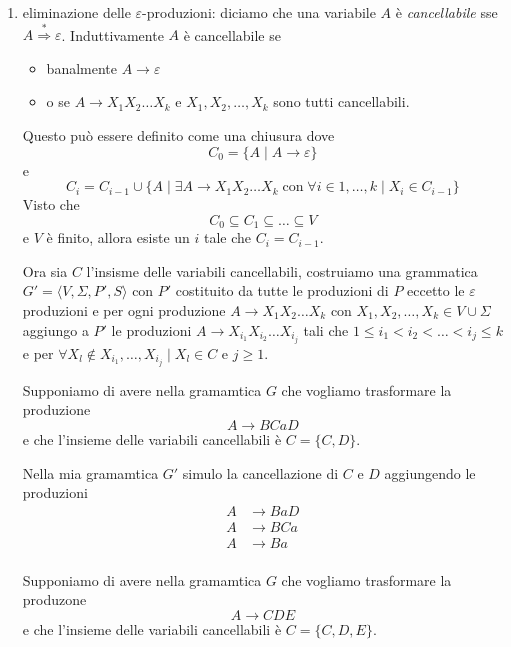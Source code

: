 \documentclass[12pt]{report}
\theoremstyle{definition}
\theoremstyle{regard}
\begin{document}
\begin{enumerate}
	\item eliminazione delle $\varepsilon$-produzioni: diciamo che una variabile $A$ è \textit{cancellabile} sse $A \overset{*}{\Rightarrow} \varepsilon$.
		Induttivamente $A$ è cancellabile se
		\begin{itemize}
			\item banalmente $A \rightarrow \varepsilon$
			\item o se $A \rightarrow X_1 X_2 \dots X_k$ e $X_1, X_2, \dots, X_k$ sono tutti cancellabili.
		\end{itemize}
		Questo può essere definito come una chiusura dove
		$$ C_0 = \{ A \mid A \rightarrow \varepsilon \} $$
		e 
		$$ C_i = C_{i - 1} \cup \{ A \mid \exists A \rightarrow X_1 X_2 \dots X_k \; \text{con} \; \forall i \in 1, \dots, k \mid X_i \in C_{i - 1} \} $$
		Visto che
		$$ C_0 \subseteq C_1 \subseteq \dots \subseteq V $$
		e $V$ è finito, allora esiste un $i$ tale che $C_i = C_{i - 1}$.

		Ora sia $C$ l'insisme delle variabili cancellabili, costruiamo una grammatica $G' = \langle V, \Sigma, P', S \rangle$ con $P'$ costituito da tutte le produzioni di $P$ eccetto le $\varepsilon$ produzioni e per ogni produzione $A \rightarrow X_1 X_2 \dots X_k$ con $X_1, X_2, \dots, X_k \in V \cup \Sigma$ aggiungo a $P'$ le produzioni $A \rightarrow X_{i_1} X_{i_2} \dots X_{i_j}$ tali che $1 \leq i_1 < i_2 < \dots < i_j \leq k$ e per $\forall X_l \not \in X_{i_1}, \dots, X_{i_j} \mid X_l \in C$ e $j \geq 1$.

		\begin{tcolorbox}
			Supponiamo di avere nella gramamtica $G$ che vogliamo trasformare la produzione
			$$ A \rightarrow B C a D $$
			e che l'insieme delle variabili cancellabili è $C = \{C, D\}$.

			Nella mia gramamtica $G'$ simulo la cancellazione di $C$ e $D$ aggiungendo le produzioni
			\begin{align*}
				A &\rightarrow B a D \\
				A &\rightarrow B C a \\
				A &\rightarrow B a \\
			\end{align*}
		\end{tcolorbox}

		\begin{tcolorbox}
			Supponiamo di avere nella gramamtica $G$ che vogliamo trasformare la produzone
			$$ A \rightarrow C D E $$
			e che l'insieme delle variabili cancellabili è $C = \{C, D, E\}$.


\end{tcolorbox}
\end{enumerate}
\end{document}
